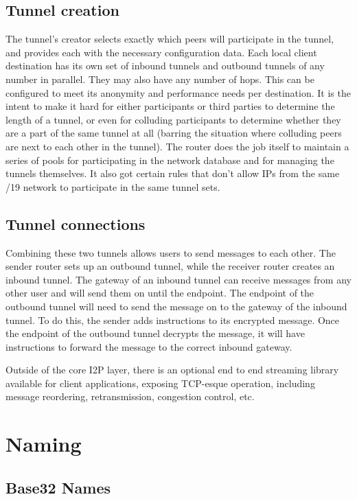 \documentclass[a4paper,twocolumn,12pt]{article}
\begin{document}
\subsection{Tunnel creation}
The tunnel's creator selects exactly which peers will participate in the tunnel,
and provides each with the necessary configuration data. Each local client destination
has its own set of inbound tunnels and outbound tunnels of any number in parallel.
They may also have any number of hops. This can be configured to meet its anonymity and
performance needs per destination. It is the intent to make it hard for either participants or
third parties to determine the length of a tunnel, or even for colluding participants
to determine whether they are a part of the same tunnel at all (barring the situation
where colluding peers are next to each other in the tunnel). The router does the job itself
to maintain a series of pools for participating in the network database and for managing the
tunnels themselves. It also got certain rules that don't allow IPs from the same /19 network to
participate in the same tunnel sets.

\subsection{Tunnel connections}
Combining these two tunnels allows users to send messages to each other. The
sender router sets up an outbound tunnel, while the receiver router creates an
inbound tunnel. The gateway of an inbound tunnel can receive messages from any
other user and will send them on until the endpoint. The endpoint of the
outbound tunnel will need to send the message on to the gateway of the inbound
tunnel. To do this, the sender adds instructions to its encrypted message. Once
the endpoint of the outbound tunnel decrypts the message, it will have
instructions to forward the message to the correct inbound gateway.

Outside of the core I2P layer, there is an optional end to
end streaming library available for client applications, exposing TCP-esque operation,
including message reordering, retransmission, congestion control, etc.

\section{Naming}

\subsection{Base32 Names}
\end{document}
